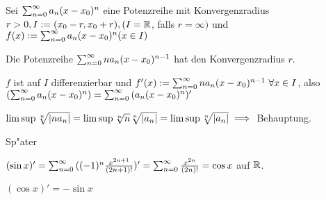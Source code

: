 \documentclass[a4paper,twoside,DIV15,BCOR12mm]{scrbook}
\begin{document}
\begin{satz}
Sei $\sum_{n=0}^{\infty}{a_n(x-x_0)^n}$ eine Potenzreihe mit Konvergenzradius $r>0, I:=(x_0-r, x_0+r), (I=\mathbb{R}$, falls $r=\infty)$ und $f(x):=\sum_{n=0}^{\infty}{a_n(x-x_0)^n} (x \in I)$
\begin{liste}
\item Die Potenzreihe $\sum_{n=0}^{\infty}{na_n(x-x_0)^{n-1}}$ hat den Konvergenzradius $r$.
\item $f$ ist auf $I$ differenzierbar und $f'(x):=\sum_{n=0}^{\infty}{na_n(x-x_0)^{n-1}}\ \forall x \in I$, also $(\sum_{n=0}^{\infty}{a_n(x-x_0)^n}) = \sum_{n=0}^{\infty}{(a_n(x-x_0)^n)'}$
\end{liste}
\end{satz}

\begin{beweise}
\item $\limsup \sqrt[n]{|na_n|}=\limsup \sqrt[n]{n}\sqrt[n]{|a_n|}=\limsup \sqrt[n]{|a_n|} \implies$ Behauptung.
\item Sp"ater
\end{beweise}

\begin{beispiele}
\item $(\sin x)' = \sum_{n=0}^{\infty}{((-1)^n\frac{x^{2n+1}}{(2n+1)!}})'=\sum_{n=0}^{\infty}{\frac{x^{2n}}{(2n)!}}=\cos x$ auf $\mathbb{R}$.
\item $(\cos x)' = -\sin x$
\end{beispiele}
\end{document}
